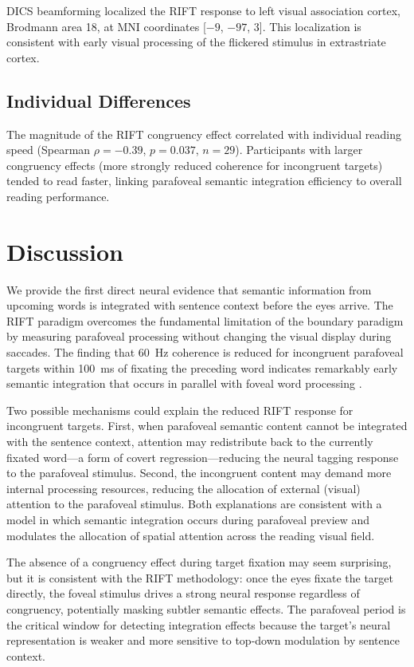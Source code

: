 \documentclass[12pt]{article}
\begin{document}
DICS beamforming localized the RIFT response to left visual association cortex, Brodmann area 18, at MNI coordinates [$-9$, $-97$, $3$]. This localization is consistent with early visual processing of the flickered stimulus in extrastriate cortex.

\subsection{Individual Differences}

The magnitude of the RIFT congruency effect correlated with individual reading speed (Spearman $\rho = -0.39$, $p = 0.037$, $n = 29$). Participants with larger congruency effects (more strongly reduced coherence for incongruent targets) tended to read faster, linking parafoveal semantic integration efficiency to overall reading performance.

\section{Discussion}

We provide the first direct neural evidence that semantic information from upcoming words is integrated with sentence context before the eyes arrive. The RIFT paradigm overcomes the fundamental limitation of the boundary paradigm by measuring parafoveal processing without changing the visual display during saccades. The finding that 60~Hz coherence is reduced for incongruent parafoveal targets within 100~ms of fixating the preceding word indicates remarkably early semantic integration that occurs in parallel with foveal word processing \citep{dimigen2011coregistration}.

Two possible mechanisms could explain the reduced RIFT response for incongruent targets. First, when parafoveal semantic content cannot be integrated with the sentence context, attention may redistribute back to the currently fixated word---a form of covert regression---reducing the neural tagging response to the parafoveal stimulus. Second, the incongruent content may demand more internal processing resources, reducing the allocation of external (visual) attention to the parafoveal stimulus. Both explanations are consistent with a model in which semantic integration occurs during parafoveal preview and modulates the allocation of spatial attention across the reading visual field.

The absence of a congruency effect during target fixation may seem surprising, but it is consistent with the RIFT methodology: once the eyes fixate the target directly, the foveal stimulus drives a strong neural response regardless of congruency, potentially masking subtler semantic effects. The parafoveal period is the critical window for detecting integration effects because the target's neural representation is weaker and more sensitive to top-down modulation by sentence context.
\end{document}
